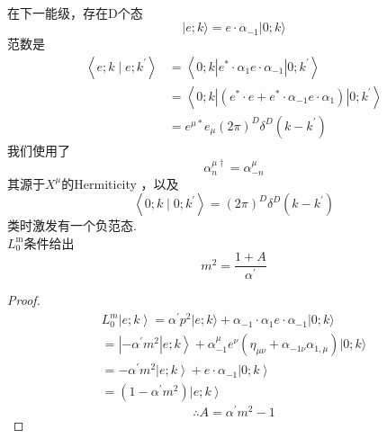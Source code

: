 \\

\noindent
在下一能级，存在D个态
\begin{equation}
|e ; k\rangle=e \cdot \alpha_{-1}|0 ; k\rangle
\end{equation}
范数是
\begin{equation}\label{4.1.13}
\begin{aligned}
\left\langle e ; k \mid e ; k^{\prime}\right\rangle &=\left\langle 0 ; k\left|e^{*} \cdot \alpha_{1} e \cdot \alpha_{-1}\right| 0 ; k^{\prime}\right\rangle \\
&=\left\langle 0 ; k\left|\left(e^{*} \cdot e+e^{*} \cdot \alpha_{-1} e \cdot \alpha_{1}\right)\right| 0 ; k^{\prime}\right\rangle \\
&=e^{\mu *} e_{\mu}(2 \pi)^{D} \delta^{D}\left(k-k^{\prime}\right)
\end{aligned}
\end{equation}
我们使用了
\begin{equation}
\alpha_{n}^{\mu \dagger}=\alpha_{-n}^{\mu}
\end{equation}
其源于$X^\mu$的Hermiticity ，以及
\begin{equation}
\left\langle 0 ; k \mid 0 ; k^{\prime}\right\rangle=(2 \pi)^{D} \delta^{D}\left(k-k^{\prime}\right)
\end{equation}
类时激发有一个负范态.\\
$L_{0}^{\mathrm{m}}$条件给出
\begin{equation}
m^{2}=\frac{1+A}{\alpha^{\prime}}
\end{equation}
\begin{proof}
	$$
	\begin{array}{l}
	L_{0}^{m}\left|e; k\right\rangle=\alpha^{\prime} p^{2}|e ; k\rangle+\alpha_{-1} \cdot \alpha_{1} e \cdot \alpha_{-1}|0 ; k\rangle \\
	\left.=\left|-\alpha^{\prime} m^{2}\right| e; k\right\rangle+\alpha_{-1}^{\mu} e^{\nu}\left(\eta_{\mu \nu}+\alpha_{-1\nu}\alpha_{1, \mu}\right)|0 ; k\rangle \\
	=-\alpha^{\prime} m^{2}\left|e;k\right\rangle+e \cdot \alpha_{-1}\left|0; k\right\rangle \\
	=\left(1-\alpha^{\prime} m^{2}\right)\left|e; k\right\rangle
	\end{array}
	$$
	$$
	\therefore A=\alpha^{\prime} m^{2}-1
	$$
\end{proof}
